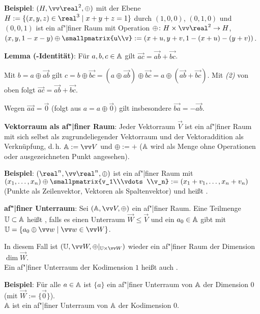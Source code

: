\textbf{Beispiel}:
$(H, \vec{\real}^2, \oplus)$ mit der Ebene $H := \{(x, y, z) \in \real^3 \;|\; x + y + z = 1\}$
durch $(1, 0, 0)$, $(0, 1, 0)$ und $(0, 0, 1)$ ist ein af"|finer Raum mit Operation
$\oplus\colon H \times \vec{\real}^2 \to H$,\\
$(x, y, 1 - x - y) \oplus \smallpmatrix{u\\v}
:= (x + u, y + v, 1 - (x + u) - (y + v))$.

\linie

\textbf{Lemma (-Identität)}:
Für $a, b, c \in \AA$ gilt $\vec{ac} = \vec{ab} + \vec{bc}$.

\begin{Beweis}
    Mit $b = a \oplus \vec{ab}$ gilt
    $c = b \oplus \vec{bc} = (a \oplus \vec{ab}) \oplus \vec{bc} = a \oplus (\vec{ab} + \vec{bc})$.
    Mit \emph{(2)} von oben folgt $\vec{ac} = \vec{ab} + \vec{bc}$.
\end{Beweis}

Wegen $\vec{aa} = \vec{0}$ (folgt aus $a = a \oplus \vec{0})$ gilt insbesondere
$\vec{ba} = -\vec{ab}$.

\linie

\textbf{Vektorraum als af"|finer Raum}:
Jeder Vektorraum $\vec{V}$ ist ein af"|finer Raum mit sich selbst als zugrundeliegender
Vektorraum und der Vektoraddition als Verknüpfung, d.\,h. $\AA := \vec{V}$ und $\oplus := +$
($\AA$ wird als Menge ohne Operationen oder ausgezeichneten Punkt angesehen).

\textbf{Beispiel}:
$(\real^n, \vec{\real}^n, \oplus)$ ist ein af"|finer Raum mit
$(x_1, \dotsc, x_n) \oplus
\smallpmatrix{v_1\\\vdots\\v_n} := (x_1 + v_1, \dotsc, x_n + v_n)$
(Punkte als Zeilenvektor, Vektoren als Spaltenvektor)
und heißt .

\linie

\textbf{af"|finer Unterraum}:
Sei $(\AA, \vec{V}, \oplus)$ ein af"|finer Raum.
Eine Teilmenge $\UU \subset \AA$ heißt ,
falls es einen Unterraum $\vec{W} \le \vec{V}$ und ein $a_0 \in \AA$ gibt mit
$\UU = \{a_0 \oplus \vec{w} \;|\; \vec{w} \in \vec{W}\}$.

In diesem Fall ist $(\UU, \vec{W}, \oplus|_{\UU \times \vec{W}})$ wieder ein af"|finer Raum
der Dimension $\dim \vec{W}$.\\
Ein af"|finer Unterraum der Kodimension $1$ heißt auch .

\textbf{Beispiel}:
Für alle $a \in \AA$ ist $\{a\}$ ein af"|finer Unterraum von $\AA$ der Dimension $0$
(mit $\vec{W} := \{\vec{0}\}$).\\
$\AA$ ist ein af"|finer Unterraum von $\AA$ der Kodimension $0$.

